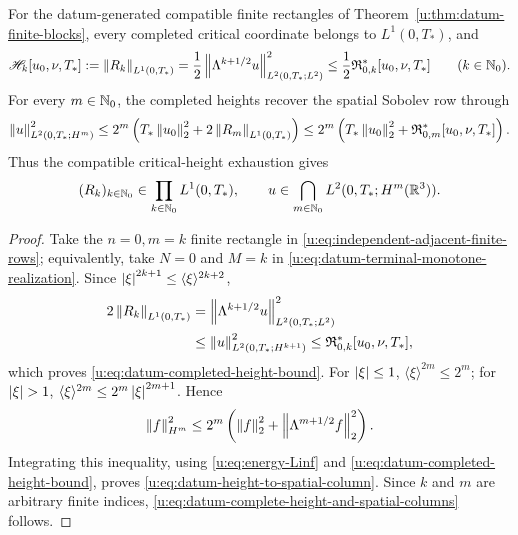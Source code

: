 \begin{corollary}
\label{u:cor:datum-critical-height-completion}
For the datum-generated compatible finite rectangles of
Theorem~\ref{u:thm:datum-finite-blocks}, every completed critical coordinate
belongs to \(L^1(0,T_*)\), and
\begin{equation}
 \mathscr H_k[u_0,\nu,T_*]
 :=\left\lVert R_k\right\rVert_{L^1(0,T_*)}
 =\frac12\left\lVert \Lambda^{k+1/2}u\right\rVert_{L^2(0,T_*;L^2)}^2
 \le\frac12\mathfrak R_{0,k}^*[u_0,\nu,T_*]
 \qquad(k\in\mathbb N_0).
 \label{u:eq:datum-completed-height-bound}
\end{equation}
For every \(m\in\mathbb N_0\), the completed heights recover the spatial Sobolev
row through
\begin{equation}
 \left\lVert u\right\rVert_{L^2(0,T_*;H^m)}^2
 \le
 2^m\left(
  T_*\left\lVert u_0\right\rVert_2^2+2\left\lVert R_m\right\rVert_{L^1(0,T_*)}
 \right)
 \le
 2^m\left(
  T_*\left\lVert u_0\right\rVert_2^2+\mathfrak R_{0,m}^*[u_0,\nu,T_*]
 \right).
 \label{u:eq:datum-height-to-spatial-column}
\end{equation}
Thus the compatible critical-height exhaustion gives
\begin{equation}
 (R_k)_{k\in\mathbb N_0}\in\prod_{k\in\mathbb N_0}L^1(0,T_*),
 \qquad
 u\in\bigcap_{m\in\mathbb N_0}L^2(0,T_*;H^m(\mathbb R^3)).
 \label{u:eq:datum-complete-height-and-spatial-columns}
\end{equation}
\end{corollary}

\begin{samepage}
\begin{proof}
Take the \(n=0,m=k\) finite rectangle in
\eqref{u:eq:independent-adjacent-finite-rows}; equivalently, take \(N=0\) and
\(M=k\) in \eqref{u:eq:datum-terminal-monotone-realization}.  Since
\(\left|\xi\right|^{2k+1}\le\langle\xi\rangle^{2k+2}\),
\begin{align*}
 2\left\lVert R_k\right\rVert_{L^1(0,T_*)}
 &=\left\lVert \Lambda^{k+1/2}u\right\rVert_{L^2(0,T_*;L^2)}^2\\
 &\le\left\lVert u\right\rVert_{L^2(0,T_*;H^{k+1})}^2
 \le\mathfrak R_{0,k}^*[u_0,\nu,T_*],
\end{align*}
which proves \eqref{u:eq:datum-completed-height-bound}.  For
\(\left|\xi\right|\le1\),
\(\langle\xi\rangle^{2m}\le2^m\); for \(\abs\xi>1\),
\(\langle\xi\rangle^{2m}\le2^m\left|\xi\right|^{2m+1}\).  Hence
\[
 \left\lVert f\right\rVert_{H^m}^2
 \le2^m\left(\left\lVert f\right\rVert_2^2+
 \left\lVert \Lambda^{m+1/2}f\right\rVert_2^2\right).
\]
Integrating this inequality, using
\eqref{u:eq:energy-Linf} and
\eqref{u:eq:datum-completed-height-bound}, proves
\eqref{u:eq:datum-height-to-spatial-column}.  Since \(k\) and \(m\) are
arbitrary finite indices, \eqref{u:eq:datum-complete-height-and-spatial-columns}
follows.
\end{proof}
\end{samepage}

